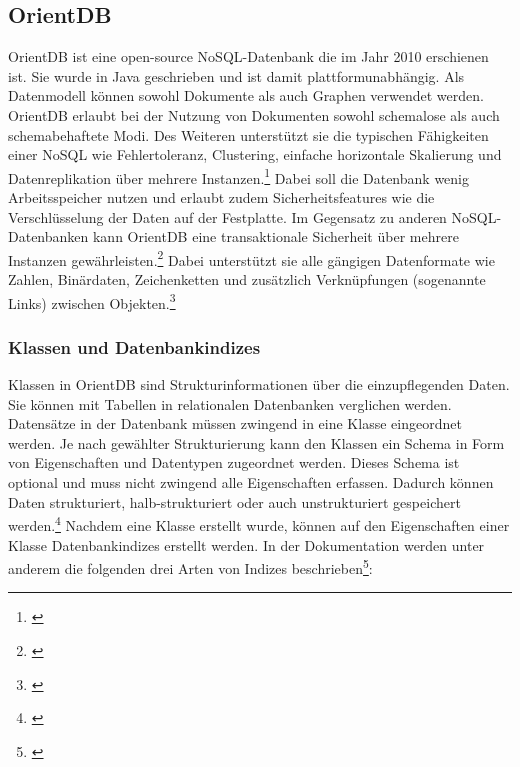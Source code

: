 
\subsection{OrientDB}


OrientDB ist eine open-source NoSQL-Datenbank die im Jahr 2010 erschienen ist. Sie wurde in Java geschrieben und ist damit plattformunabhängig. Als Datenmodell können sowohl Dokumente als auch Graphen verwendet werden. OrientDB erlaubt bei der Nutzung von Dokumenten sowohl schemalose als auch schemabehaftete Modi. Des Weiteren unterstützt sie die typischen Fähigkeiten einer NoSQL wie Fehlertoleranz, Clustering, einfache horizontale Skalierung und Datenreplikation über mehrere Instanzen.\footnote{\cite[Vgl.][]{OrientDBGettingStarted}} Dabei soll die Datenbank wenig Arbeitsspeicher nutzen und erlaubt zudem Sicherheitsfeatures wie die Verschlüsselung der Daten auf der Festplatte. Im Gegensatz zu anderen NoSQL-Datenbanken kann OrientDB eine transaktionale Sicherheit über mehrere Instanzen gewährleisten.\footnote{\cite[Vgl.][]{OrientDBTransactions}} Dabei unterstützt sie alle gängigen Datenformate wie Zahlen, Binärdaten, Zeichenketten und zusätzlich Verknüpfungen (sogenannte Links) zwischen Objekten.\footnote{\cite[Vgl.][]{OrientDBTypes}}

\subsubsection{Klassen und Datenbankindizes}

Klassen in OrientDB sind Strukturinformationen über die einzupflegenden Daten. Sie können mit Tabellen in relationalen Datenbanken verglichen werden. Datensätze in der Datenbank müssen zwingend in eine Klasse eingeordnet werden. Je nach gewählter Strukturierung kann den Klassen ein Schema in Form von Eigenschaften und Datentypen zugeordnet werden. Dieses Schema ist optional und muss nicht zwingend alle Eigenschaften erfassen. Dadurch können Daten strukturiert, halb-strukturiert oder auch unstrukturiert gespeichert werden.\footnote{\cite[Vgl.][]{OrientDBClasses}} Nachdem eine Klasse erstellt wurde, können auf den Eigenschaften einer Klasse Datenbankindizes erstellt werden. In der Dokumentation werden unter anderem die folgenden drei Arten von Indizes beschrieben\footnote{\cite[Vgl.][]{OrientDBIndexes}}:

